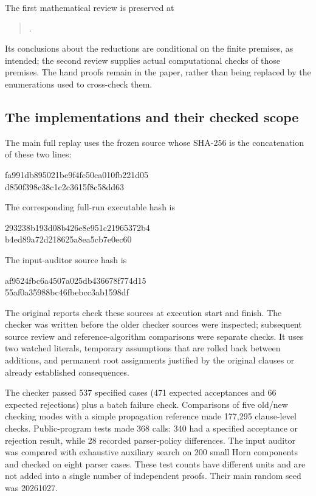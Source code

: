 The first mathematical review is preserved at
\begin{quote}\small\raggedright
{}.
\end{quote}
Its conclusions about the reductions are conditional on the finite
premises, as intended; the second review supplies actual computational
checks of those premises. The hand proofs remain in the paper, rather
than being replaced by the enumerations used to cross-check them.

\subsection{The implementations and their checked scope}
The main full replay uses the frozen  source whose
SHA-256 is the concatenation of these two lines:
\begin{center}\small\ttfamily
fa991db895021be9f4fc50ca010fb221d05\\
d850f398c38c1c2c3615f8c58dd63
\end{center}
The corresponding full-run executable hash is
\begin{center}\small\ttfamily
293238b193d08b426e8e951c21965372b4\\
b4ed89a72d218625a8ea5cb7e0ec60
\end{center}
The input-auditor source hash is
\begin{center}\small\ttfamily
af9524fbc6a4507a025db436678f774d15\\
55af0a35988bc46fbebcc3ab1598df
\end{center}
The original reports check these sources at execution start and finish.
The checker was written before the older checker sources were inspected;
subsequent source review and reference-algorithm comparisons were separate
checks. It uses two watched literals, temporary assumptions that are
rolled back between additions, and permanent root assignments justified
by the original clauses or already established consequences.

The checker passed 537 specified cases (471 expected acceptances and 66
expected rejections) plus a batch failure check. Comparisons of five
old/new checking modes with a simple propagation reference made 177,295
clause-level checks. Public-program tests made 368 calls: 340 had a
specified acceptance or rejection result, while 28 recorded parser-policy
differences. The input auditor was compared with exhaustive auxiliary
search on 200 small Horn components and checked on eight parser cases.
These test counts have different units and are not added into a single
number of independent proofs. Their main random seed was 20261027.

